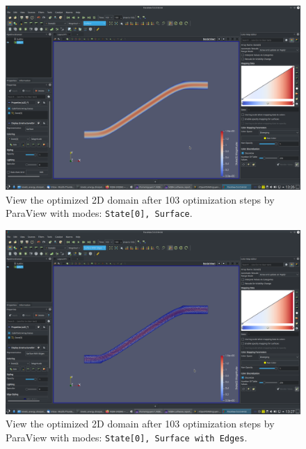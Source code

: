 \documentclass[onsided]{book}
\numberwithin{equation}{section}
\begin{document}
\begin{enumerate}
\begin{enumerate}
        \begin{figure}[H]
            \centering
            \includegraphics[height=0.44\textheight]{optimized_domain_2D_after_103_steps_State0_Surface}
            \caption{View the optimized 2D domain after 103 optimization steps by ParaView with modes: \texttt{State[0], Surface}.}
        \end{figure}
        
        \begin{figure}[H]
            \centering
            \includegraphics[height=0.44\textheight]{optimized_domain_2D_after_103_steps_State0_Surface_with_Edges}
            \caption{View the optimized 2D domain after 103 optimization steps by ParaView with modes: \texttt{State[0], Surface with Edges}.}
        \end{figure}
    

\end{enumerate}
\end{enumerate}
\end{document}
